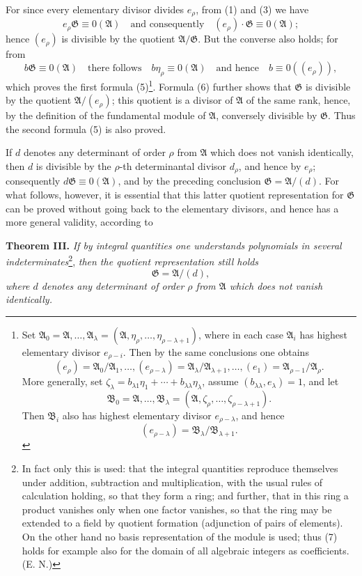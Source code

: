 \documentclass[11pt]{article}
\newcommand{\Amod}{\mathfrak A}
\newcommand{\Bmod}{\mathfrak B}
\newcommand{\Gmod}{\mathfrak G}
\newcommand{\zero}[1]{\equiv 0(#1)}
\begin{document}
For since every elementary divisor divides $e_\rho$, from (1) and (3) we have
\begin{equation}
 e_\rho\Gmod\zero{\Amod}\quad \text{and consequently}\quad (e_\rho)\cdot\Gmod\zero{\Amod};
\tag{6}
\end{equation}
hence $(e_\rho)$ is divisible by the quotient $\Amod/\Gmod$. But the converse also holds; for from
\[
 b\Gmod\zero{\Amod}
 \quad\text{there follows}\quad b\eta_\rho\zero{\Amod}
 \quad\text{and hence}\quad b\zero{(e_\rho)},
\]
which proves the first formula (5)\footnote{Set $\Amod_0=\Amod,\ldots,\Amod_\lambda=(\Amod,\eta_\rho,\ldots,\eta_{\rho-\lambda+1})$, where in each case $\Amod_i$ has highest elementary divisor $e_{\rho-i}$. Then by the same conclusions one obtains
\[
 (e_\rho)=\Amod_0/\Amod_1,\ldots,(e_{\rho-\lambda})=\Amod_\lambda/\Amod_{\lambda+1},\ldots,(e_1)=\Amod_{\rho-1}/\Amod_\rho.
\]
More generally, set $\zeta_\lambda=b_{\lambda1}\eta_1+\cdots+b_{\lambda\lambda}\eta_\lambda$, assume $(b_{\lambda\lambda},e_\lambda)=1$, and let
\[
 \Bmod_0=\Amod,\ldots,\Bmod_\lambda=(\Amod,\zeta_\rho,\ldots,\zeta_{\rho-\lambda+1}).
\]
Then $\Bmod_i$ also has highest elementary divisor $e_{\rho-\lambda}$, and hence
\[
 (e_{\rho-\lambda})=\Bmod_\lambda/\Bmod_{\lambda+1}.
\]}. Formula (6) further shows that $\Gmod$ is divisible by the quotient $\Amod/(e_\rho)$; this quotient is a divisor of $\Amod$ of the same rank, hence, by the definition of the fundamental module of $\Amod$, conversely divisible by $\Gmod$. Thus the second formula (5) is also proved.

If $d$ denotes any determinant of order $\rho$ from $\Amod$ which does not vanish identically, then $d$ is divisible by the $\rho$-th determinantal divisor $d_\rho$, and hence by $e_\rho$; consequently $d\Gmod\zero{\Amod}$, and by the preceding conclusion $\Gmod=\Amod/(d)$. For what follows, however, it is essential that this latter quotient representation for $\Gmod$ can be proved without going back to the elementary divisors, and hence has a more general validity, according to

\medskip
\noindent\textbf{Theorem III.} \emph{If by integral quantities one understands polynomials in several indeterminates}\footnote{In fact only this is used: that the integral quantities reproduce themselves under addition, subtraction and multiplication, with the usual rules of calculation holding, so that they form a ring; and further, that in this ring a product vanishes only when one factor vanishes, so that the ring may be extended to a field by quotient formation (adjunction of pairs of elements). On the other hand no basis representation of the module is used; thus (7) holds for example also for the domain of all algebraic integers as coefficients. (E. N.)}, \emph{then the quotient representation still holds}
\begin{equation}
 \Gmod=\Amod/(d),
\tag{7}
\end{equation}
\emph{where $d$ denotes any determinant of order $\rho$ from $\Amod$ which does not vanish identically.}
\end{document}
